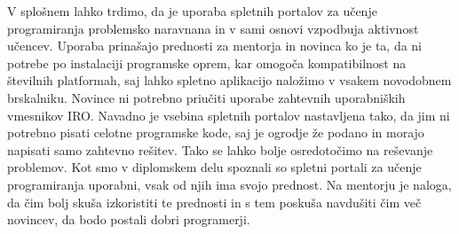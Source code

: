 V splošnem lahko trdimo, da je uporaba spletnih portalov za učenje
programiranja problemsko naravnana in v sami osnovi vzpodbuja
aktivnost učencev. Uporaba prinašajo prednosti za mentorja in novinca
ko je ta, da ni potrebe po instalaciji programske oprem, kar omogoča
kompatibilnost na številnih platformah, saj lahko spletno aplikacijo
naložimo v vsakem novodobnem brskalniku. Novince ni potrebno priučiti
uporabe zahtevnih uporabniških vmesnikov IRO. Navadno je vsebina
spletnih portalov nastavljena tako, da jim ni potrebno pisati celotne
programske kode, saj je ogrodje že podano in morajo napisati samo
zahtevno rešitev. Tako se lahko bolje osredotočimo na reševanje
problemov. Kot smo v diplomskem delu spoznali so spletni portali za
učenje programiranja uporabni, vsak od njih ima svojo prednost. Na
mentorju je naloga, da čim bolj skuša izkoristiti te prednosti in s
tem poskuša navdušiti čim več novincev, da bodo postali dobri
programerji.


